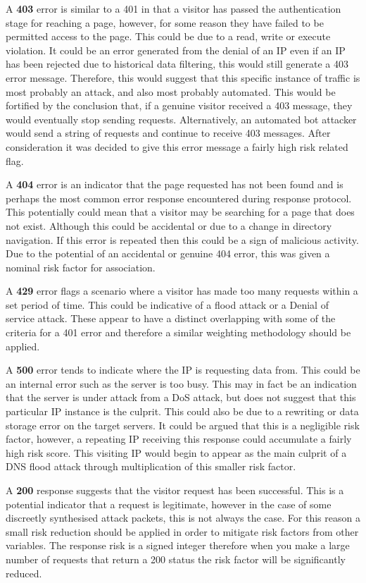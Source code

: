 A \textbf{403} error is similar to a 401 in that a visitor has passed the authentication stage for reaching a page, however, for some reason they have failed to be permitted access to the page. This could be due to a read, write or execute violation. It could be an error generated from the denial of an IP even if an IP has been rejected due to historical data filtering, this would still generate a 403 error message. Therefore, this would suggest that this specific instance of traffic is most probably an attack, and also most probably automated. This would be fortified by the conclusion that, if a genuine visitor received a 403 message, they would eventually stop sending requests. Alternatively, an automated bot attacker would send a string of requests and continue to receive 403 messages. After consideration it was decided to give this error message a fairly high risk related flag.


A \textbf{404} error is an indicator that the page requested has not been found and is perhaps the most common error response encountered during response protocol. This potentially could mean that a visitor may be searching for a page that does not exist. Although this could be accidental or due to a change in directory navigation. If this error is repeated then this could be a sign of malicious activity. Due to the potential of an accidental or genuine 404 error, this was given a nominal risk factor for association.

A \textbf{429} error flags a scenario where a visitor has made too many requests within a set period of time. This could be indicative of a flood attack or a Denial of service attack. These appear to have a distinct overlapping with some of the criteria for a 401 error and therefore a similar weighting methodology should be applied. 


A \textbf{500} error tends to indicate where the IP is requesting data from. This could be an internal error such as the server is too busy. This may in fact be an indication that the server is under attack from a DoS attack, but does not suggest that this particular IP instance is the culprit. This could also be due to a rewriting or data storage error on the target servers. It could be argued that this is a negligible risk factor, however, a repeating IP receiving this response could accumulate a fairly high risk score. This visiting IP would begin to appear as the main culprit of a DNS flood attack through multiplication of this smaller risk factor.

A \textbf{200} response suggests that the visitor request has been successful. This is a potential indicator that a request is legitimate, however in the case of some discreetly synthesised attack packets, this is not always the case. For this reason a small risk reduction should be applied in order to mitigate risk factors from other variables. The response risk is a signed integer therefore when you make a large number of requests that return a 200 status the risk factor will be significantly reduced.



